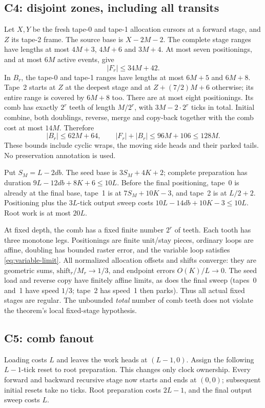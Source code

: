 \subsection{C4: disjoint zones, including all transits}

Let $X,Y$ be the fresh tape-0 and tape-1 allocation cursors at a forward
stage, and $Z$ its tape-2 frame. The source base is $X-2M-2$.
The complete stage ranges have lengths at most $4M+3$, $4M+6$ and
$3M+4$. At most seven positionings, and at most $6M$ active events,
give
\[
 |F_r|\le34M+42.
\]
In $B_r$, the tape-0 and tape-1 ranges have lengths at most $6M+5$
and $6M+8$. Tape~2 starts at $Z$ at the deepest stage and at
$Z+(7/2)M+6$ otherwise; its entire range is covered by $6M+8$ too.
There are at most eight positionings. Its comb has exactly $2^r$ teeth
of length $M/2^r$, with $3M-2\cdot2^r$ ticks in total. Initial combine,
both doublings, reverse, merge and copy-back together with the comb
cost at most $14M$. Therefore
\[
 |B_r|\le62M+64,\qquad |F_r|+|B_r|\le96M+106\le128M.
\]
These bounds include cyclic wraps, the moving side heads and their
parked tails. No preservation annotation is used.

Put $S_M=L-2db$. The seed base is $3S_M+4K+2$; complete preparation
has duration $9L-12db+8K+6\le10L$. Before the final positioning,
tape~0 is already at the final base, tape~1 is at $7S_M+10K-3$, and
tape~2 is at $L/2+2$. Positioning plus the $3L$-tick output sweep
costs $10L-14db+10K-3\le10L$. Root work is at most $20L$.

At fixed depth, the comb has a fixed finite number $2^r$ of teeth.
Each tooth has three monotone legs. Positionings are finite unit/stay
pieces, ordinary loops are affine, doubling has bounded raster error,
and the variable loop satisfies \eqref{eq:variable-limit}. All normalized
allocation offsets and shifts converge: they are geometric sums,
$\mathrm{shift}_r/M_r\to1/3$, and endpoint errors $O(K)/L\to0$.
The seed load and reverse copy have finitely affine limits, as does
the final sweep (tapes~0 and~1 have speed $1/3$; tape~2 has speed~1
then parks). Thus all actual fixed stages are regular. The unbounded
\emph{total} number of comb teeth does not violate the theorem's local
fixed-stage hypothesis.

\subsection{C5: comb fanout}

Loading costs $L$ and leaves the work heads at $(L-1,0)$. Assign the
following $L-1$-tick reset to root preparation. This changes only clock
ownership. Every forward and backward recursive stage now starts and ends
at $(0,0)$; subsequent initial resets take no ticks. Root preparation
costs $2L-1$, and the final output sweep costs $L$.

